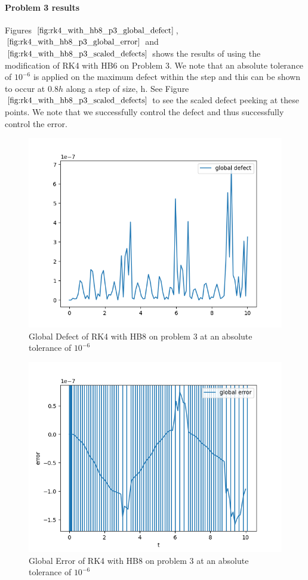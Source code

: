 \documentclass{article}
\begin{document}
\paragraph{Problem 3 results}
Figures $\ref{fig:rk4_with_hb8_p3_global_defect}$, $\ref{fig:rk4_with_hb8_p3_global_error}$ and $\ref{fig:rk4_with_hb8_p3_scaled_defects}$ shows the results of using the modification of RK4 with HB6 on Problem 3. 
We note that an absolute tolerance of $10^{-6}$ is applied on the maximum defect within the step and this can be shown to occur at $0.8h$ along a step of size, h. See Figure $\ref{fig:rk4_with_hb8_p3_scaled_defects}$ to see the scaled defect peeking at these points. We note that we successfully control the defect and thus successfully control the error.

\begin{figure}[H]
\centering
\includegraphics[width=0.7\linewidth]{./figures/rk4_with_hb8_p3_global_defect}
\caption{Global Defect of RK4 with HB8 on problem 3 at an absolute tolerance of $10^{-6}$}
\label{fig:rk4_with_hb8_p3_global_defect}
\end{figure}

\begin{figure}[H]
\centering
\includegraphics[width=0.7\linewidth]{./figures/rk4_with_hb8_p3_global_error}
\caption{Global Error of RK4 with HB8 on problem 3 at an absolute tolerance of $10^{-6}$}
\label{fig:rk4_with_hb8_p3_global_error}
\end{figure}
\end{document}
